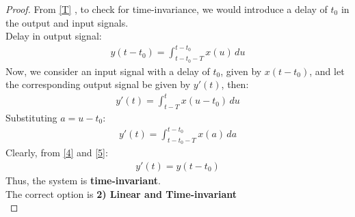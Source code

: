 \documentclass[journal,12pt,twocolumn]{IEEEtran}
\begin{document}
\begin{proof}
From \eqref{T} , to check for time-invariance, we would introduce a delay of $t_0$ in the output and input signals.\\
Delay in output signal:
\begin{align}
    y(t-t_0) = \int_{t-t_0-T}^{t-t_0} x(u)\,du
    \label{4}
\end{align}
Now, we consider an input signal with a delay of $t_0$, given by $x(t-t_0)$, and let the corresponding output signal be given by $y'(t)$, then:
\begin{align}
    y'(t) = \int_{t-T}^{t} x(u-t_0)\,du
\end{align}
Substituting $a = u-t_0$:
\begin{align}
    y'(t) = \int_{t-t_0-T}^{t-t_0} x(a)\,da
    \label{5}
\end{align}
Clearly, from \eqref{4} and \eqref{5}:
\begin{align}
    y'(t) = y(t-t_0)
\end{align}
Thus, the system is \textbf{time-invariant}.\\
The correct option is \textbf{2) Linear and Time-invariant}\\


\end{proof}
\end{document}
